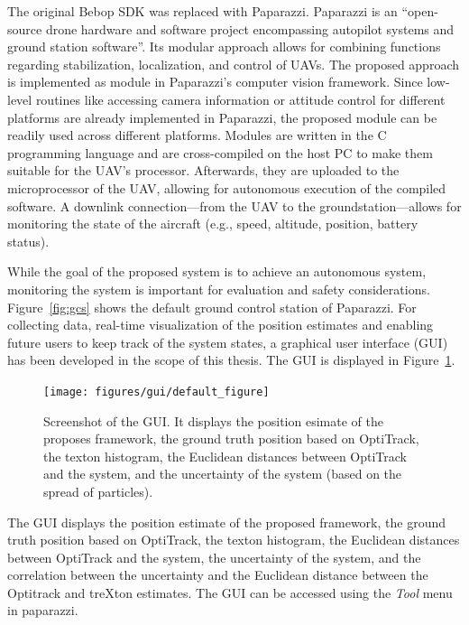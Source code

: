 The original Bebop SDK was replaced with Paparazzi. Paparazzi is an
``open-source drone hardware and software project encompassing
autopilot systems and ground station software''. Its modular approach
allows for combining functions regarding stabilization, localization,
and control of UAVs.
The proposed approach is implemented as module in Paparazzi's computer
vision framework. Since low-level routines like accessing camera
information or attitude control for different platforms are already
implemented in Paparazzi, the proposed module can be readily used
across different platforms. Modules are written in the C programming
language and are cross-compiled on the host PC to make them suitable
for the UAV's processor. Afterwards, they are uploaded to the
microprocessor of the UAV, allowing for autonomous execution of the
compiled software. A downlink connection---from the UAV to the
groundstation---allows for monitoring the state of the aircraft (e.g.,
speed, altitude, position, battery status).

While the goal of the proposed system is to achieve an autonomous
system, monitoring the system is important for evaluation and safety
considerations. Figure~\ref{fig:gcs} shows the default ground control
station of Paparazzi.
For collecting data, real-time visualization of the position estimates
and enabling future users to keep track of the system states, a
graphical user interface (GUI) has been developed in the scope of this
thesis. The GUI is displayed in Figure~\ref{fig:gui}.

\begin{figure}[h!]
\begin{center}
\texttt{[image: figures/gui/default\_figure]}
\caption{{\label{fig:gui} Screenshot of the GUI. It displays
    the position esimate of the proposes framework, the ground truth
    position based on OptiTrack, the texton histogram, the Euclidean
    distances between OptiTrack and the system, and the uncertainty of
    the system (based on the spread of particles).%
}}
\end{center}
\end{figure}

The GUI displays the position estimate of the proposed framework, the
ground truth position based on OptiTrack, the texton histogram, the
Euclidean distances between OptiTrack and the system, the uncertainty
of the system, and the correlation between the uncertainty and the
Euclidean distance between the Optitrack and treXton estimates. The
GUI can be accessed using the \emph{Tool} menu in paparazzi.


